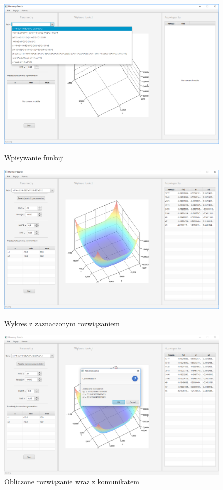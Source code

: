 \documentclass[10pt, a4paper]{article}
\begin{document}
\begin{figure}[htbp] 
	\begin{minipage}[b]{.5\linewidth}
		\centering
		\includegraphics[width=\linewidth]{images/1.PNG} 
		\caption{Wpisywanie funkcji}
		\label{fig:1}
	\end{minipage} 
	\begin{minipage}[b]{.5\linewidth}
		\centering
		\includegraphics[width=\linewidth]{images/3.PNG} 
		\caption{Wykres z zaznaczonym rozwiązaniem}
		\label{fig:2}
	\end{minipage}
	\newline
	\newline
	\begin{minipage}[b]{1\linewidth}
		\centering
		\includegraphics[width=.9\linewidth]{images/2.PNG} 
		\caption{Obliczone rozwiązanie wraz z komunikatem}
		\label{fig:3}
	\end{minipage}
\end{figure}
\end{document}
